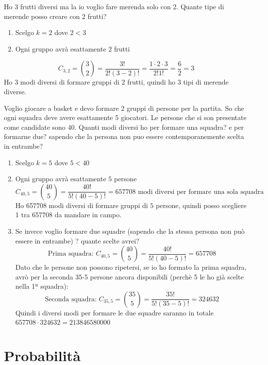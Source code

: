 \documentclass{article}  %
\theoremstyle{definition}
\begin{document}
\begin{esercizio}[Esempio]
	Ho 3 frutti diversi ma la io voglio fare merenda solo con 2. Quante tipe di merende posso creare con 2 frutti?
	\begin{enumerate}
		\item Scelgo $k=2$ dove $2<3$
		\item Ogni gruppo avrà esattamente $2$ frutti
	\end{enumerate}
	\[
		C_{3,2}=\binom{3}{2}=\frac{3!}{2!(3-2)!}=\frac{1 \cdot 2  \cdot 3}{2!1!}=\frac{6}{2}=3
	\]
	Ho 3 modi diversi di formare gruppi di $2$ frutti, quindi ho 3 tipi di merende diverse.
\end{esercizio}
\begin{esercizio}[Esempio]
	Voglio giocare a basket e devo formare 2 gruppi di persone per la partita. So che ogni squadra deve avere esattamente 5 giocatori. Le persone che si son presentate come candidate
	sono 40. Quanti modi diversi ho per formare una squadra? e per formarne due? sapendo che la persona non puo essere contemporanemente scelta in entrambe?
	\begin{enumerate}
		\item Scelgo $k=5$ dove $5<40$
		\item Ogni gruppo avrà esattamente $5$ persone
		      \[
			      C_{40,5}=\binom{40}{5}=\frac{40!}{5!(40-5)!}= 657708 \text{ modi diversi per formare una sola squadra}
		      \]
		      Ho 657708 modi diversi di formare gruppi di $5$ persone, quindi posso scegliere 1 tra 657708 da mandare in campo.

		\item Se invece voglio formare due squadre (sapendo che la stessa persona non può essere in entrambe) ? quante scelte avrei?
		      \[
			      \text{Prima squadra: } C_{40,5}=\binom{40}{5}=\frac{40!}{5!(40-5)!}= 657708
		      \]
		      Dato che le persone non possono ripetersi, se io ho formato la prima squadra, avrò per la seconda 35-5 persone ancora disponibili (perchè 5 le ho già scelte nella 1ª squadra):
		      \[
			      \text{Seconda squadra: } C_{35,5}=\binom{35}{5}=\frac{35!}{5!(35-5)!}=324632
		      \]
		      Quindi i diversi modi per formare le due squadre saranno in totale $657708 \cdot 324632=213846580000$
	\end{enumerate}
\end{esercizio}
\break
\section{Probabilità}
\end{document}
